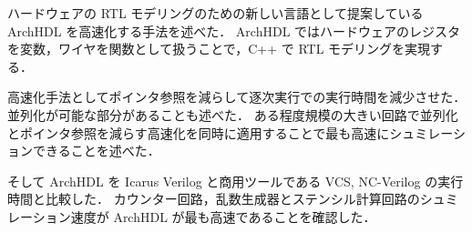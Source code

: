 ハードウェアの RTL モデリングのための新しい言語として提案している ArchHDL を高速化する手法を述べた．
ArchHDL ではハードウェアのレジスタを変数，ワイヤを関数として扱うことで，C++ で RTL モデリングを実現する．

高速化手法としてポインタ参照を減らして逐次実行での実行時間を減少させた．
並列化が可能な部分があることも述べた．
ある程度規模の大きい回路で並列化とポインタ参照を減らす高速化を同時に適用することで最も高速にシュミレーションできることを述べた．

そして ArchHDL を Icarus Verilog と商用ツールである VCS, NC-Verilog の実行時間と比較した．
カウンター回路，乱数生成器とステンシル計算回路のシュミレーション速度が ArchHDL が最も高速であることを確認した．
